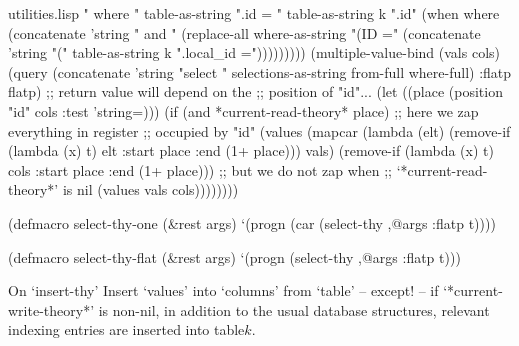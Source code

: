 \begin{common}{utilities.lisp}
                             " where "
                             table-as-string
                             ".id = "
                             table-as-string
                             k
                             ".id"
                             (when where
                               (concatenate
                                'string
                                " and "
                                (replace-all
                                 where-as-string
                                 "(ID ="
                                 (concatenate
                                  'string
                                  "("
                                  table-as-string
                                  k
                                  ".local_id =")))))))))
        (multiple-value-bind (vals cols)
            (query 
             (concatenate 'string
                          "select "
                          selections-as-string
                          from-full
                          where-full)
             :flatp flatp)
          ;; return value will depend on the
          ;; position of "id"...
          (let ((place (position "id" cols :test 'string=)))
            (if (and *current-read-theory*
                     place)
                ;; here we zap everything in register
                ;; occupied by "id"
                (values (mapcar 
                         (lambda (elt) 
                           (remove-if
                            (lambda (x) t)
                            elt
                            :start place
                            :end (1+ place)))
                         vals)
                        (remove-if
                         (lambda (x) t) cols
                         :start place
                         :end (1+ place)))
                ;; but we do not zap when
                ;; `*current-read-theory*' is nil
                (values vals cols))))))))

(defmacro select-thy-one (&rest args)
  `(progn
     (car (select-thy ,@args :flatp t))))

(defmacro select-thy-flat (&rest args)
  `(progn
     (select-thy ,@args :flatp t)))
\end{common}

\begin{notate}{On `insert-thy'}
Insert `values' into `columns' from `table' -- except! --
if `*current-write-theory*' is non-nil, in addition to the
usual database structures, relevant indexing entries are
inserted into table$k$.
\end{notate}

